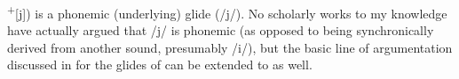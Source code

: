 \textsuperscript{+}[j]) is a phonemic (underlying) glide (/j/). No scholarly works to my knowledge have actually argued that /j/ is phonemic (as opposed to being synchronically derived from another sound, presumably /i/), but the basic line of argumentation discussed in \citet{Hall2017} for the glides of  can be extended to  as well.

